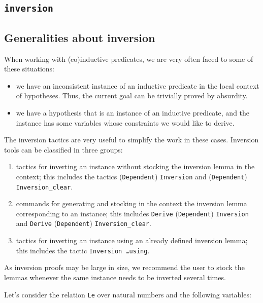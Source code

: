 \begin{coq_example*}
\section{{\tt inversion}}
\label{inversion-examples}

\subsection*{Generalities about inversion}

When working with (co)inductive predicates, we are very often faced to
some of these situations:
\begin{itemize}
\item we have an inconsistent instance of an inductive predicate in the
  local context of hypotheses. Thus, the current goal can be trivially
  proved by absurdity. 
\item we have a hypothesis that is an instance of an inductive
  predicate, and the instance has some variables whose constraints we
  would like to derive.
\end{itemize}

The inversion tactics are very useful to simplify the work in these
cases. Inversion tools can be classified in three groups:

\begin{enumerate}
\item tactics for inverting an instance without stocking the inversion
  lemma in the context; this includes the tactics
  (\texttt{Dependent})  \texttt{Inversion} and
 (\texttt{Dependent}) \texttt{Inversion\_clear}.
\item commands for generating and stocking in the context the inversion
  lemma corresponding to an instance; this includes \texttt{Derive}
  (\texttt{Dependent}) \texttt{Inversion} and \texttt{Derive}
  (\texttt{Dependent}) \texttt{Inversion\_clear}.
\item tactics for inverting an instance using an already defined
  inversion lemma; this includes the tactic \texttt{Inversion \ldots using}.
\end{enumerate}

As inversion proofs may be large in size, we recommend the user to
stock the lemmas whenever the same instance needs to be inverted
several times.

\firstexample
{}

Let's consider the relation \texttt{Le} over natural numbers and the
following variables:


\end{coq_example*}
